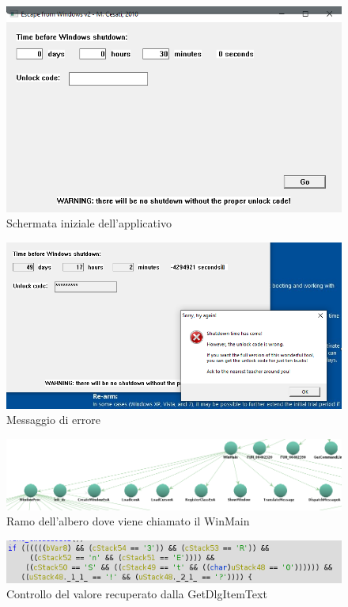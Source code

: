 \documentclass[12pt]{extarticle}
\begin{document}
\begin{figure}[!h]
\includegraphics[scale=0.5]{immagini/app1}
\caption{Schermata iniziale dell'applicativo}
\label{Figura 1}
\end{figure}
\vspace{3cm}
\begin{figure}[!h]
\includegraphics[scale=0.5]{immagini/app2}
\caption{Messaggio di errore}
\label{Figura 2}
\end{figure}
\vspace{3cm}
\begin{figure}[!h]
\includegraphics[scale=0.5]{immagini/win_main}
\caption{Ramo dell'albero dove viene chiamato il WinMain}
\label{Figura 3}
\end{figure}
\vspace{3cm}
\begin{figure}[!h]
\includegraphics[scale=1]{immagini/sblocco}
\caption{Controllo del valore recuperato dalla GetDlgItemText}
\label{Figura 4}
\end{figure}
\end{document}
